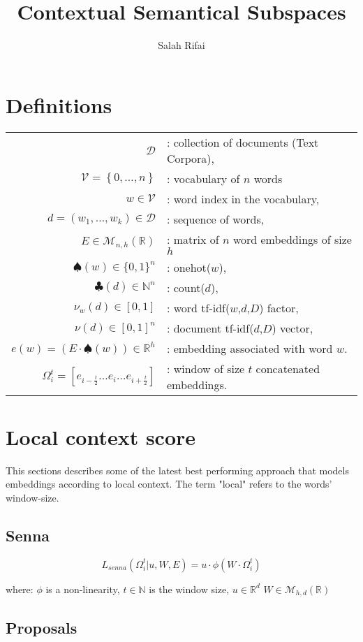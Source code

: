 \documentclass[11pt]{article} %
\title{Contextual Semantical Subspaces}
\author{Salah Rifai}
\begin{document}
\maketitle
\section{Definitions}
\begin{tabular}{r l}
 $\mathcal{D}$ &:  collection of documents (Text Corpora), \\
$\mathcal{V} = \left\{0,\ldots,n\right\}$ &: vocabulary of $n$ words \\
 $w \in \mathcal{V}$ &: word index in the vocabulary,\\
 $d = (w_1,\ldots,w_k) \in \mathcal{D}$ &: sequence of words, \\
$E \in \mathcal{M}_{n,h}(\mathbb{R})$&: matrix of $n$ word embeddings of size $h$\\
$\spadesuit(w) \in \{0,1\}^n$&: onehot($w$), \\
$\clubsuit(d) \in \mathbb{N}^n$&: count($d$), \\
$ \nu_w (d) \in \left[0,1\right]$ &: word tf-idf($w$,$d$,$D$) factor, \\
$\nu(d) \in  \left[0,1\right]^n$&: document tf-idf($d$,$D$) vector, \\
$ e(w)=\left(E\cdot\spadesuit\left(w\right)\right)  \in \mathbb{R}^h$&: embedding associated with word $w$.\\
$\Omega_i^t =  \left[e_{i-\frac{t}{2}} \ldots e_{i}  \ldots e_{i+\frac{t}{2}} \right]$ & : window  of size $t$ concatenated embeddings.
\end{tabular} 

\section{Local context score}
This sections describes some of the latest best performing approach
that models embeddings according to local context. The term "local"
refers to the words' window-size.
\subsection{Senna}

\[ L_{senna} \left(\Omega_i^t | u,W,E\right) = u \cdot \phi \left( W \cdot \Omega_i^t \right)  \]

where:
$\phi$ is a non-linearity, $t \in \mathbb{N}$ is the window size, $u \in \mathbb{R}^d$  $W \in \mathcal{M}_{h,d}(\mathbb{R})$
\subsection{Proposals}
\end{document}
